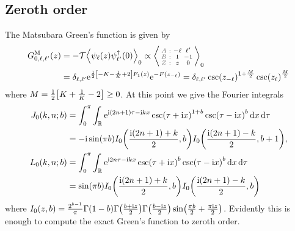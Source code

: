 \documentclass[english, parskip=full]{scrartcl}
\begin{document}
\subsection{Zeroth order}
The Matsubara Green's function is given by
\begin{align}
G_{0,\ell,\ell'}^\M(z) &= -\mathcal{T} \bra*{\psi_\ell(z) \psi_{\ell'}^\dagger(0)}_0 \propto \bra*{\zabx{-\ell & \ell'}{1 & -1}{z & 0}}_0\\
&= \delta_{\ell,\ell'} \powe{\frac{1}{2}\klb*{-K - \frac{1}{K} + 2}F_1(z)} \powe{-F\kla*{z_{-\ell}}} = \delta_{\ell,\ell'} \csc(z_{-\ell})^{1 + \frac{M}{2}} \csc(z_\ell)^\frac{M}{2}
\end{align}
where $M=\frac{1}{2} \klb*{K + \frac{1}{K} - 2} \ge 0$.
At this point we give the Fourier integrals
\begin{align}
J_0(k,n; b) &= \intx{0}{\pi}{\intr{\powe{\i (2n+1)\tau - \i kx} \csc(\tau + \i x)^{1+b} \csc(\tau - \i x)^b}{x} }{\tau}\\
&= -\i\sin(\pi b) I_0\kla*{\frac{\i(2n+1) + k}{2}, b} I_0\kla*{\frac{\i(2n+1) - k}{2}, b+1},\\
L_0(k,n; b) &= \intx{0}{\pi}{\intr{\powe{\i 2n\tau - \i kx} \csc(\tau + \i x)^{b} \csc(\tau - \i x)^b}{x} }{\tau}\\
&= \sin(\pi b) I_0\kla*{\frac{\i(2n+1) + k}{2}, b} I_0\kla*{\frac{\i(2n+1) - k}{2}, b}
\end{align}
where $I_0(z,b) = \frac{2^{b-1}}{\pi} \Gamma(1-b) \Gamma\kla*{\frac{b+\i z}{2}} \Gamma\kla*{\frac{b-\i z}{2}} \sin\kla*{\frac{\pi b}{2} + \frac{\pi\i z}{2}}$.
Evidently this is enough to compute the exact Green's function to zeroth order.
\end{document}
